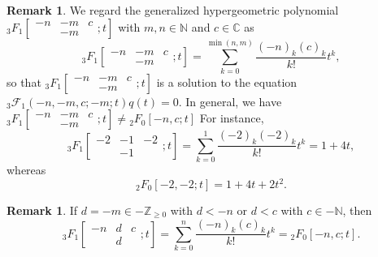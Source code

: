 \documentclass[a4paper,11pt,reqno]{amsart}
\newcommand{\CC}{\mathbb{C}}
\newcommand{\NN}{\mathbb{N}}
\newcommand{\calF}{\mathcal{F}}
\newcommand{\0}{{\bf 0}}
\newcommand{\N}{\mathbb{N}}
\newcommand{\Z}{\mathbb{Z}}
\newcommand{\1}{{\bf 1}}
\theoremstyle{plain}
\theoremstyle{definition}
\newtheorem{remark}[equation]{Remark}
\numberwithin{equation}{section}
\theoremstyle{definition}
\begin{document}
\begin{remark}
We regard the generalized hypergeometric polynomial
$
{}_3F_1\left [\begin{matrix}
-n& -m & c \\
& -m &  
\end{matrix};t\right ]
$ with $m,n \in \NN$ and $c \in \CC$ as
\begin{equation*}
{}_3F_1\left [\begin{matrix}
-n& -m & c \\
& -m &  
\end{matrix};t\right ]
=
\sum_{k=0}^{\min(n,m)}
\frac{(-n)_k(c)_k}{k!}t^k,
\end{equation*}
so that 
$
{}_3F_1\left [\begin{matrix}
-n& -m & c \\
& -m&  
\end{matrix};t\right ]
$
is a solution to the equation
${}_3\calF_1(-n,-m,c;-m;t)q(t)=0$.
In general, we have
$
{}_3F_1\left [\begin{matrix}
-n& -m & c \\
& -m &  
\end{matrix};t\right ]
\neq
{}_2F_0[-n, c ;t]
$
For instance,
\begin{equation*}
{}_3F_1\left[\begin{matrix}
-2 & -1 & -2\\
& -1 &
\end{matrix};
t\right] = \sum_{k=0}^{1} \frac{(-2)_k(-2)_k}{k!}t^k = 1+4t,
\end{equation*}
whereas
\begin{equation*}
{}_2F_0[-2, -2; t] = 1+4t+2t^2.
\end{equation*}
\end{remark}

\begin{remark}\label{rem:3F1_2F0}
If $d=-m \in -\Z_{\geq 0}$ with $d< -n$ or $d < c$ with $c \in -\N$, then
\begin{equation*}
{}_3F_1\left [\begin{matrix}
-n& d & c \\
& d &  
\end{matrix};t\right ]
=\sum_{k=0}^{n}
\frac{(-n)_k(c)_k}{k!}t^k
={}_2F_0[-n, c ;t].
\end{equation*}
\end{remark}
\end{document}
